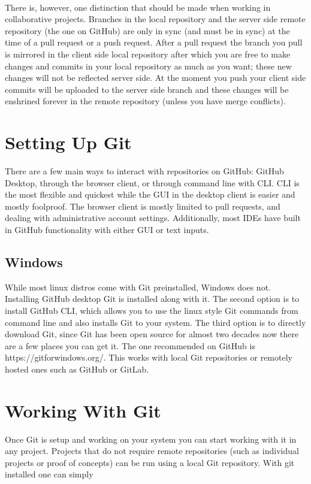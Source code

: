 \documentclass{article}
\begin{document}
\paragraph{}
There is, however, one distinction that should be made when working in collaborative projects. Branches in the local repository and the server side remote repository (the one on GitHub) are only in sync (and must be in sync) at the time of a pull request or a push request. After a pull request the branch you pull is mirrored in the client side local repository after which you are free to make changes and commits in your local repository as much as you want; these new changes will not be reflected server side. At the moment you push your client side commits will be uploaded to the server side branch and these changes will be enshrined forever in the remote repository (unless you have merge conflicts).
\section{Setting Up Git}
There are a few main ways to interact with repositories on GitHub: GitHub Desktop, through the browser client, or through command line with CLI. CLI is the most flexible and quickest while the GUI in the desktop client is easier and mostly foolproof. The browser client is mostly limited to pull requests, and dealing with administrative account settings. Additionally, most IDEs have built in GitHub functionality with either GUI or text inputs. 
\subsection{Windows}
While most linux distros come with Git preinstalled, Windows does not. Installing GitHub desktop Git is installed along with it. The second option is to install GitHub CLI, which allows you to use the linux style Git commands from command line and also installs Git to your system. The third option is to directly download Git, since Git has been open source for almost two decades now there are a few places you can get it. The one recommended on GitHub is https://gitforwindows.org/. This works with local Git repositories or remotely hosted ones such as GitHub or GitLab.
\section{Working With Git}
Once Git is setup and working on your system you can start working with it in any project. Projects that do not require remote repositories (such as individual projects or proof of concepts) can be run using a local Git repository. With git installed one can simply 
\end{document}

